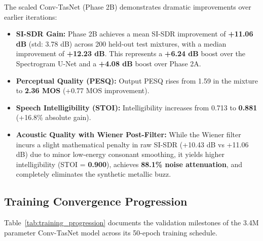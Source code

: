 \documentclass[11pt,a4paper]{report}
\begin{document}
The scaled Conv-TasNet (Phase 2B) demonstrates dramatic improvements over earlier iterations:
\begin{itemize}
    \item \textbf{SI-SDR Gain:} Phase 2B achieves a mean SI-SDR improvement of \textbf{+11.06 dB} (std: 3.78 dB) across 200 held-out test mixtures, with a median improvement of \textbf{+12.23 dB}. This represents a \textbf{+6.24 dB} boost over the Spectrogram U-Net and a \textbf{+4.08 dB} boost over Phase 2A.
    \item \textbf{Perceptual Quality (PESQ):} Output PESQ rises from 1.59 in the mixture to \textbf{2.36 MOS} (+0.77 MOS improvement).
    \item \textbf{Speech Intelligibility (STOI):} Intelligibility increases from 0.713 to \textbf{0.881} (+16.8\% absolute gain).
    \item \textbf{Acoustic Quality with Wiener Post-Filter:} While the Wiener filter incurs a slight mathematical penalty in raw SI-SDR (+10.43 dB vs +11.06 dB) due to minor low-energy consonant smoothing, it yields higher intelligibility (STOI = \textbf{0.900}), achieves \textbf{88.1\% noise attenuation}, and completely eliminates the synthetic metallic buzz.
\end{itemize}

\subsection{Training Convergence Progression}
Table~\ref{tab:training_progression} documents the validation milestones of the 3.4M parameter Conv-TasNet model across its 50-epoch training schedule.
\end{document}
